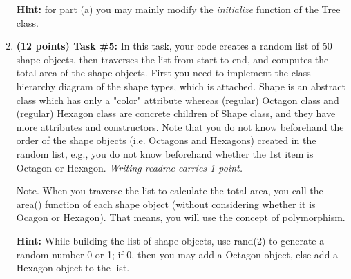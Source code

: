 \documentclass[paper=letter, fontsize=11pt]{scrartcl} %
\begin{document}
\begin{enumerate}[noitemsep]
\textbf{Hint:} for part (a) you may mainly modify the \emph{initialize} function of the Tree class.
       \item \textbf{(12 points) Task \#5:} In this task, your code creates a random list of 50 shape objects, 
then traverses the list from start to end, and computes the total area of the shape objects. 
First you need to implement the class hierarchy diagram of the shape types, which is attached. 
Shape is an abstract class which has only a "color" attribute whereas (regular) 
Octagon class and (regular) Hexagon
class are concrete children of Shape class, and they have more attributes and constructors. 
Note that you do not know beforehand the order of the shape objects 
(i.e. Octagons and Hexagons) created in the random list, e.g., 
you do not know beforehand whether the 1st item is Octagon or Hexagon.
\emph{Writing readme carries 1 point.}

Note. When you traverse the list to calculate the total area, you call the area() function 
of each shape object (without considering whether it is Ocagon or Hexagon). 
That means, you will use the concept of polymorphism.

\textbf{Hint:} While building the list of shape objects, use rand(2) to generate a random number 0 or 1; if 0, then you may add a Octagon object, else add a Hexagon object to the list.
    \end{enumerate}
       
\end{document}
